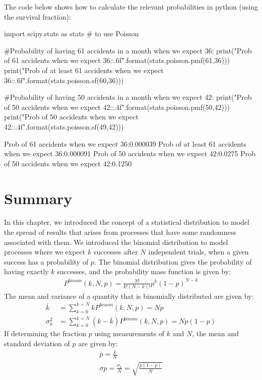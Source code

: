 \begin{example}
The code below shows how to calculate the relevant probabilities in python (using the survival fraction):
\begin{python}[caption = Computing Poisson probability of null hypothesis] 
import scipy.stats as stats # to use Poisson

#Probability of having 61 accidents in a month when we expect 36:
print("Prob of 61 accidents when we expect 36:{:.6f}".format(stats.poisson.pmf(61,36)))
print("Prob of at least 61 accidents when we expect 36:{:.6f}".format(stats.poisson.sf(60,36)))

#Probability of having 50 accidents in a month when we expect 42:
print("Prob of 50 accidents when we expect 42:{:.4f}".format(stats.poisson.pmf(50,42)))
print("Prob of 50 accidents when we expect 42:{:.4f}".format(stats.poisson.sf(49,42)))
\end{python}
\begin{poutput}
Prob of 61 accidents when we expect 36:0.000039
Prob of at least 61 accidents when we expect 36:0.000091
Prob of 50 accidents when we expect 42:0.0275
Prob of 50 accidents when we expect 42:0.1250
\end{poutput}
\end{example}


\section{Summary}
In this chapter, we introduced the concept of a statistical distribution to model the spread of results that arises from processes that have some randomness associated with them. We introduced the binomial distribution to model processes where we expect $k$ successes after $N$ independent trials, when a given success has a probability of $p$. The binomial distribution gives the probability of having exactly $k$ successes, and the probability mass function is given by:
\begin{align}
P^{binom}(k,N,p)=\frac{N!}{k!(N-k)!}p^k(1-p)^{N-k}
\end{align}
The mean and variance of a quantity that is binomially distributed are given by:
\begin{align}
\bar k &= \sum_{k=0}^{k=N}kP^{binom}(k,N,p)=Np\\
\sigma_k^2 &= \sum_{k=0}^{k=N}(k-\bar k)P^{binom}(k,N,p)=Np(1-p)
\end{align}
If determining the fraction $p$ using measurements of $k$ and $N$, the mean and standard deviation of $p$ are given by:
\begin{align}
\bar p = \frac{k}{N}\\
\sigma p = \frac{\sigma_k}{N}=\sqrt{\frac{p(1-p)}{N}}
\end{align}

